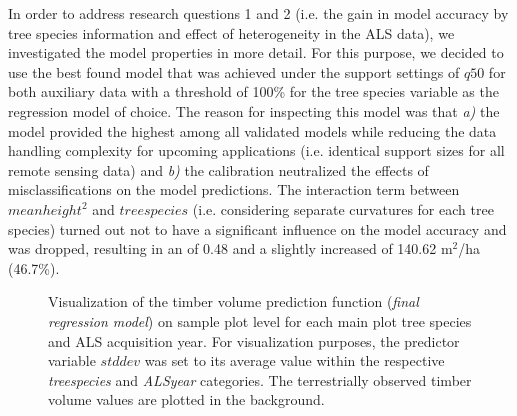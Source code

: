 In order to address research questions 1 and 2 (i.e. the gain in model accuracy by tree species information and effect of heterogeneity in the ALS data), we investigated the model properties in more detail. For this purpose, we decided to use the best found model that was achieved under the support settings of $q50$ for both auxiliary data with a threshold of 100\% for the tree species variable as the regression model of choice. The reason for inspecting this model was that \textit{a)} the model provided the highest \adjrsq{} among all validated models while reducing the data handling complexity for upcoming applications (i.e. identical support sizes for all remote sensing data) and \textit{b)} the calibration neutralized the effects of misclassifications on the model predictions. The interaction term between $meanheight^2$ and $treespecies$ (i.e. considering separate curvatures for each tree species) turned out not to have a significant influence on the model accuracy and was dropped, resulting in an \adjrsq{} of 0.48 and a slightly increased \rmsecv{} of 140.62 m$^2$/ha (46.7\%). 

\begin{figure}[h]
	\centering
	\caption{Visualization of the timber volume prediction function (\textit{final regression model}) on sample plot level for each main plot tree species and ALS acquisition year. For visualization purposes, the predictor variable $stddev$ was set to its average value within the respective \textit{treespecies} and \textit{ALSyear} categories. The terrestrially observed timber volume values are plotted in the background.}
	\label{fig:predlines_tspec}
\end{figure}

